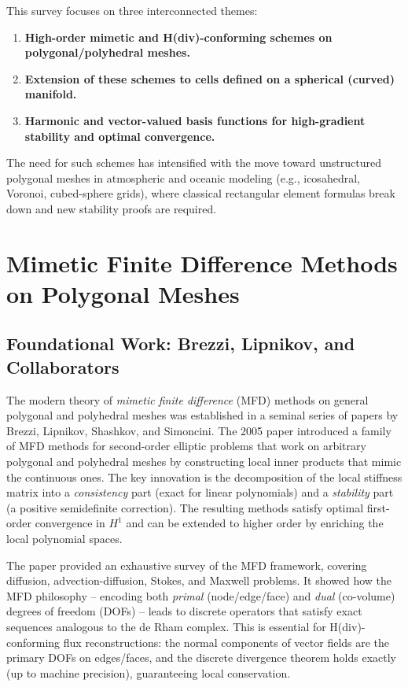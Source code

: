 This survey focuses on three interconnected themes:
\begin{enumerate}[nosep]
  \item \textbf{High-order mimetic and H(div)-conforming schemes on
        polygonal/polyhedral meshes.}
  \item \textbf{Extension of these schemes to cells defined on a spherical
        (curved) manifold.}
  \item \textbf{Harmonic and vector-valued basis functions for high-gradient
        stability and optimal convergence.}
\end{enumerate}

The need for such schemes has intensified with the move toward unstructured
polygonal meshes in atmospheric and oceanic modeling (e.g., icosahedral,
Voronoi, cubed-sphere grids), where classical rectangular element formulas
break down and new stability proofs are required.

\section{Mimetic Finite Difference Methods on Polygonal Meshes}

\subsection{Foundational Work: Brezzi, Lipnikov, and Collaborators}

The modern theory of \emph{mimetic finite difference} (MFD) methods on
general polygonal and polyhedral meshes was established in a seminal series
of papers by Brezzi, Lipnikov, Shashkov, and Simoncini. The 2005 paper
\cite{brezzi2005family} introduced a family of MFD methods for second-order
elliptic problems that work on arbitrary polygonal and polyhedral meshes by
constructing local inner products that mimic the continuous ones. The key
innovation is the decomposition of the local stiffness matrix into a
\emph{consistency} part (exact for linear polynomials) and a \emph{stability}
part (a positive semidefinite correction). The resulting methods satisfy
optimal first-order convergence in $H^1$ and can be extended to higher order
by enriching the local polynomial spaces.

The paper \cite{lipnikov2014mimetic} provided an exhaustive survey of the MFD
framework, covering diffusion, advection-diffusion, Stokes, and Maxwell
problems. It showed how the MFD philosophy -- encoding both \emph{primal}
(node/edge/face) and \emph{dual} (co-volume) degrees of freedom (DOFs) --
leads to discrete operators that satisfy exact sequences analogous to the de
Rham complex. This is essential for H(div)-conforming flux reconstructions:
the normal components of vector fields are the primary DOFs on edges/faces,
and the discrete divergence theorem holds exactly (up to machine precision),
guaranteeing local conservation.

